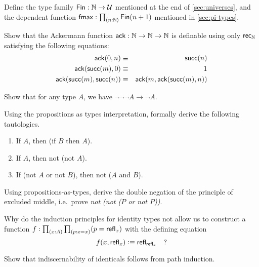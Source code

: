 \begin{ex}\label{ex:fin}
  Define the type family $\mathsf{Fin} : \mathbb{N} \to \mathcal{U}$ mentioned at the end of \autoref{sec:universes}, and the dependent function $\fmax : \prd{n:\nat} \Fin(n+1)$ mentioned in \autoref{sec:pi-types}.
\end{ex}

\begin{ex}\label{ex:ackermann}
  Show that the Ackermann function $\mathsf{ack} : \mathbb{N} \to \mathbb{N} \to \mathbb{N}$ is definable using only $\mathsf{rec}_{\mathbb{N}}$ satisfying the following equations:
  \begin{eqnarray*}
    \mathsf{ack}(0,n) & \equiv & \mathsf{succ}(n) \\
    \mathsf{ack}(\mathsf{succ}(m),0) & \equiv & 1 \\
    \mathsf{ack}(\mathsf{succ}(m),\mathsf{succ}(n)) & \equiv & \mathsf{ack}(m,\mathsf{ack}(\mathsf{succ}(m),n))
  \end{eqnarray*}
\end{ex}

\begin{ex}\label{ex:neg-ldn}
  Show that for any type $A$, we have $\neg\neg\neg A \to \neg A$.
\end{ex}

\begin{ex}\label{ex:tautologies}
  Using the propositions as types interpretation, formally derive the following tautologies.
  \begin{enumerate}
  \item If $A$, then (if $B$ then $A$).
  \item If $A$, then not (not $A$).
  \item If (not $A$ or not $B$), then not ($A$ and $B$).
  \end{enumerate}
\end{ex}

\begin{ex}\label{ex:not-not-lem}
  Using propositions-as-types, derive the double negation of the principle of excluded middle, i.e.\ prove \emph{not (not ($P$ or not $P$))}.
\end{ex}

\begin{ex}\label{ex:without-K}
  Why do the induction principles for identity types not allow us to construct a function $f: \prd{x:A}{p:x=x} (p = \refl{x})$ with the defining equation
  \[ f(x,\mathsf{refl}_{x}) \vcentcolon\equiv \mathsf{refl}_{\mathsf{refl}_{x}} \quad ?\]
\end{ex}

\begin{ex}\label{ex:subtFromPathInd}
  Show that indiscernability of identicals follows from path induction.  
\end{ex}


